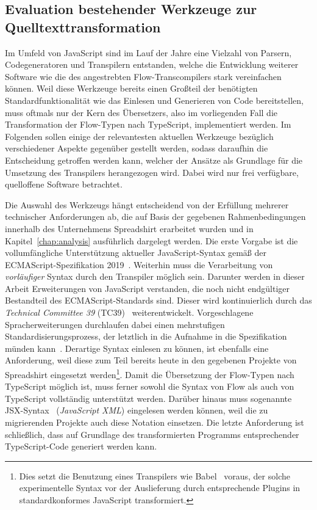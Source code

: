 \subsection{Evaluation bestehender Werkzeuge zur Quelltexttransformation}
\label{sec:js-transpilers}

Im Umfeld von JavaScript sind im Lauf der Jahre eine Vielzahl von Parsern, Codegeneratoren und Transpilern entstanden, welche die Entwicklung weiterer Software wie die des angestrebten Flow-Transcompilers stark vereinfachen können. Weil diese Werkzeuge bereits einen Großteil der benötigten Standardfunktionalität wie das Einlesen und Generieren von Code bereitstellen, muss oftmals nur der Kern des Übersetzers, also im vorliegenden Fall die Transformation der Flow-Typen nach TypeScript, implementiert werden. Im Folgenden sollen einige der relevantesten aktuellen Werkzeuge bezüglich verschiedener Aspekte gegenüber gestellt werden, sodass daraufhin die Entscheidung getroffen werden kann, welcher der Ansätze als Grundlage für die Umsetzung des Transpilers herangezogen wird. Dabei wird nur frei verfügbare, quelloffene Software betrachtet.

Die Auswahl des Werkzeugs hängt entscheidend von der Erfüllung mehrerer technischer Anforderungen ab, die auf Basis der gegebenen Rahmenbedingungen innerhalb des Unternehmens Spreadshirt erarbeitet wurden und in Kapitel~\ref{chap:analysis} ausführlich dargelegt werden. Die erste Vorgabe ist die vollumfängliche Unterstützung aktueller JavaScript-Syntax gemäß der ECMAScript-Spezifikation 2019~\autocite{ECMASCRIPT:2019}. Weiterhin muss die Verarbeitung von \emph{vorläufiger} Syntax durch den Transpiler möglich sein. Darunter werden in dieser Arbeit Erweiterungen von JavaScript verstanden, die noch nicht endgültiger Bestandteil des ECMAScript-Standards sind. Dieser wird kontinuierlich durch das \textit{Technical Committee 39} (TC39)~\autocite{TC39_COMMITTEE} weiterentwickelt. Vorgeschlagene Spracherweiterungen durchlaufen dabei einen mehrstufigen Standardisierungsprozess, der letztlich in die Aufnahme in die Spezifikation münden kann~\autocite{TC39_PROCESS}. Derartige Syntax einlesen zu können, ist ebenfalls eine Anforderung, weil diese zum Teil bereits heute in den gegebenen Projekte von Spreadshirt eingesetzt werden\footnote{Dies setzt die Benutzung eines Transpilers wie Babel~\autocite{BABEL} voraus, der solche experimentelle Syntax vor der Auslieferung durch entsprechende Plugins in standardkonformes JavaScript transformiert.}. Damit die Übersetzung der Flow-Typen nach TypeScript möglich ist, muss ferner sowohl die Syntax von Flow als auch von TypeScript vollständig unterstützt werden. Darüber hinaus muss sogenannte JSX-Syntax~\autocite{SOFTWARE:JSX} (\textit{JavaScript XML}) eingelesen werden können, weil die zu migrierenden Projekte auch diese Notation einsetzen. Die letzte Anforderung ist schließlich, dass auf Grundlage des transformierten Programms entsprechender TypeScript-Code generiert werden kann.

